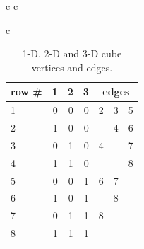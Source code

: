 \begin{table}[htp]
\begin{tabular}{c c}
\begin{tabular}{c}
      \begin{tabular}{|l ||r|r|r|| r r r|}
        \hline
        row \# & 1 & 2 & 3 & \multicolumn{3}{c|}{edges} \\
        \hline
        1 & 0 & 0& 0 & 2 & 3 & 5\\
        \hline
        2 & 1 & 0 & 0 & & 4 & 6\\
        \hline
        3 & 0 & 1 & 0 & 4 & & 7\\
        \hline
        4 & 1 & 1 & 0 & & & 8\\
        \hline
        5 & 0 & 0 & 1 & 6 & 7 & \\
        \hline
        6 & 1 & 0 & 1 & & 8 & \\
        \hline
        7 & 0 & 1 & 1 & 8 & & \\
        \hline
        8 & 1 & 1 & 1 & & & \\
        \hline
      \end{tabular}
    \end{tabular}
  \end{tabular}

  \caption{1-D, 2-D and 3-D cube vertices and edges.}
  \label{verticetable}
\end{table}

